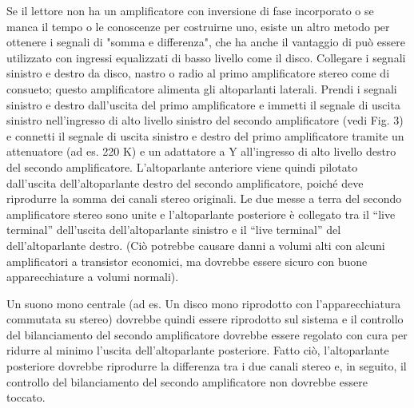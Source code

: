 \documentclass[11pt]{article}
\begin{document}
\begin{multicols*}{2}
Se il lettore non ha un amplificatore con inversione di fase incorporato o se manca il tempo o le conoscenze per costruirne uno, esiste un altro metodo per ottenere i segnali di "somma e differenza", che ha anche il vantaggio di può essere utilizzato con ingressi equalizzati di basso livello come il disco. Collegare i segnali sinistro e destro da disco, nastro o radio al primo amplificatore stereo come di consueto; questo amplificatore alimenta gli altoparlanti laterali. Prendi i segnali sinistro e destro dall'uscita del primo amplificatore e immetti il segnale di uscita sinistro nell'ingresso di alto livello sinistro del secondo amplificatore (vedi Fig. 3) e connetti il segnale di uscita sinistro e destro del primo amplificatore tramite un attenuatore (ad es. 220 K) e un adattatore a Y all'ingresso di alto livello destro del secondo amplificatore. L'altoparlante anteriore viene quindi pilotato dall'uscita dell'altoparlante destro del secondo amplificatore, poiché deve riprodurre la somma dei canali stereo originali. Le due messe a terra del secondo amplificatore stereo sono unite e l'altoparlante posteriore è collegato tra il “live terminal” dell'uscita dell'altoparlante sinistro e il “live terminal” del dell’altoparlante destro. (Ciò potrebbe causare danni a volumi alti con alcuni amplificatori a transistor economici, ma dovrebbe essere sicuro con buone apparecchiature a volumi normali).

Un suono mono centrale (ad es. Un disco mono riprodotto con l'apparecchiatura commutata su stereo) dovrebbe quindi essere riprodotto sul sistema e il controllo del bilanciamento del secondo amplificatore dovrebbe essere regolato con cura per ridurre al minimo l'uscita dell'altoparlante posteriore. Fatto ciò, l'altoparlante posteriore dovrebbe riprodurre la differenza tra i due canali stereo e, in seguito, il controllo del bilanciamento del secondo amplificatore non dovrebbe essere toccato.




\end{multicols*}
\end{document}
